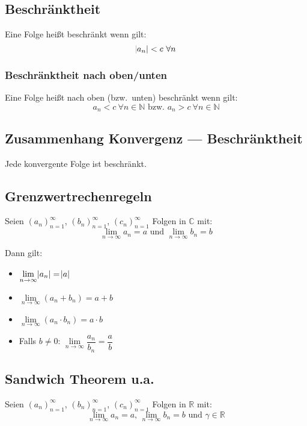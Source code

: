 \documentclass[10pt]{article}
\newcommand{\R}{\mathbb{R}}
\newcommand{\C}{\mathbb{C}}
\newcommand{\an}{{(a_n)}_{n=1}^\infty}
\begin{document}
    \subsection{Beschränktheit}
    Eine Folge heißt beschränkt wenn gilt:
    \begin{equation*}
        \abs{a_n} < c\ \forall n
    \end{equation*}

    \subsubsection{Beschränktheit nach oben/unten}
    Eine Folge heißt nach oben (bzw.~unten) beschränkt wenn gilt:
    \begin{equation*}
        a_n < c\ \forall n \in \mathbb{N} \text{ bzw. }a_n > c\ \forall n \in \mathbb{N}
    \end{equation*}

    \subsection{Zusammenhang Konvergenz --- Beschränktheit}
    Jede konvergente Folge ist beschränkt.

    \subsection{Grenzwertrechenregeln}
    Seien $\an$, ${(b_n)}_{n=1}^\infty$, ${(c_n)}_{n=1}^\infty$ Folgen
    in $\C$ mit:
    \begin{equation*}
        \lim_{n \rightarrow \infty} a_n = a \text{ und }
        \lim_{n \rightarrow \infty} b_n = b
    \end{equation*}

    Dann gilt:

    \begin{itemize}
        \item $\lim\limits_{n \rightarrow \infty} \abs{a_n} = \abs{a}$
        \item $\lim\limits_{n \rightarrow \infty}(a_n + b_n) = a + b$
        \item $\lim\limits_{n \rightarrow \infty}(a_n \cdot b_n) = a \cdot b$
        \item Falls $b \neq 0$:
        $\lim\limits_{n \rightarrow \infty}\dfrac{a_n}{b_n} = \dfrac{a}{b}$
    \end{itemize}

    \subsection{Sandwich Theorem u.a.}
    Seien $\an$, ${(b_n)}_{n=1}^\infty$, ${(c_n)}_{n=1}^\infty$
    Folgen in $\R$ mit:
    \begin{equation*}
        \lim_{n \rightarrow \infty}a_n = a \text{, }
        \lim_{n \rightarrow \infty}b_n = b \text{ und } \gamma \in \mathbb{R}
    \end{equation*}
\end{document}
